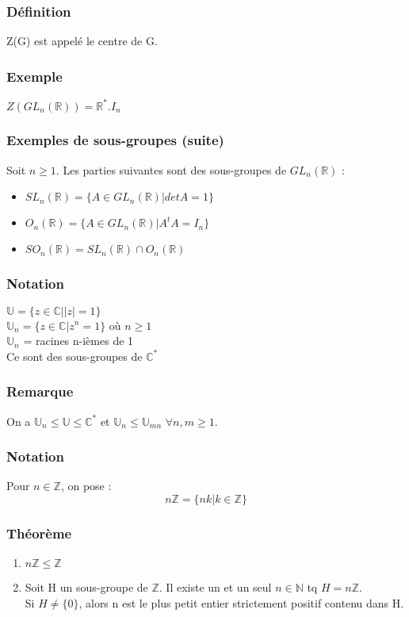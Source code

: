 \documentclass[a4paper, oneside]{report}
\newcommand{\R}{\mathbb{R}}
\newcommand{\N}{\mathbb{N}}
\newcommand{\C}{\mathbb{C}}
\newcommand{\Z}{\mathbb{Z}}
\newcommand{\U}{\mathbb{U}}
\begin{document}
\subsubsection{Définition}
Z(G) est appelé le centre de G.

\subsubsection{Exemple}
$Z(GL_n(\R)) = \R^* . I_n$

\subsubsection{Exemples de sous-groupes (suite)}
Soit $n\geq 1$. Les parties suivantes sont des sous-groupes de $GL_n(\R)$ :
\begin{itemize}
\item $SL_n(\R)=\{A\in GL_n(\R) | det A=1 \}$
\item $O_n(\R) = \{A\in GL_n(\R) | A^tA=I_n \}$
\item $SO_n(\R) = SL_n(\R) \cap O_n(\R)$
\end{itemize}

\subsubsection{Notation}
$\U = \{z\in \C | |z|=1 \}$\\
$\U_n = \{z\in \C | z^n =1 \}$ où $n\geq 1$\\
$\U_n$ = {racines n-ièmes de 1}\\
Ce sont des sous-groupes de $\C^*$\\

\subsubsection{Remarque}
On a $\U_n \leq \U \leq \C^*$ et $\U_n \leq \U_{mn}$ $\forall n,m\geq 1$.\\

\subsubsection{Notation}
Pour $n\in \Z$, on pose :
$$n\Z = \{nk| k\in \Z \}$$

\subsubsection{Théorème}
\begin{enumerate}
\item $n\Z \leq \Z$
\item Soit H un sous-groupe de $\Z$. Il existe un et un seul $n\in \N$ tq $H=n\Z$.\\
Si $H\neq \{0\}$, alors n est le plus petit entier strictement positif contenu dans H.
\end{enumerate}
\end{document}
